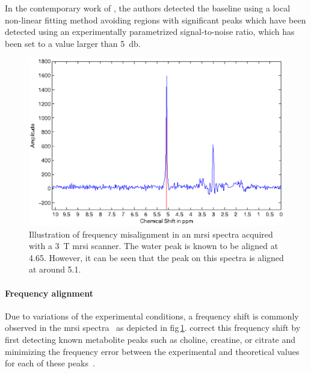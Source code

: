In the contemporary work of \citeauthor{Tiwari2012}, the authors detected the baseline using a local non-linear fitting method avoiding regions with significant peaks which have been detected using an experimentally parametrized signal-to-noise ratio, which has been set to a value larger than \SI{5}{\decibel}.

\begin{figure}
\centering
\includegraphics[width=0.7\linewidth]{3_review/figures/processing/pre-processing/frequency/frequency.eps}
\caption[Illustration of frequency misalignment in an \acs*{mrsi} spectra.]{Illustration of frequency misalignment in an \acs*{mrsi} spectra acquired with a \SI{3}{\tesla} \acs*{mrsi} scanner. The water peak is known to be aligned at \SI{4.65}{\ppm}. However, it can be seen that the peak on this spectra is aligned at around \SI{5.1}{\ppm}.}
\label{fig:frequency}
\end{figure}

\paragraph{Frequency alignment}
Due to variations of the experimental conditions, a frequency shift is commonly observed in the \ac{mrsi} spectra~\cite{Chen2002,Osorio-Garcia2012} as depicted in \acs{fig}\,\ref{fig:frequency}.
\citeauthor{Tiwari2012} correct this frequency shift by first detecting known metabolite peaks such as choline, creatine, or citrate and minimizing the frequency error between the experimental and theoretical values for each of these peaks~\cite{Tiwari2012}.

